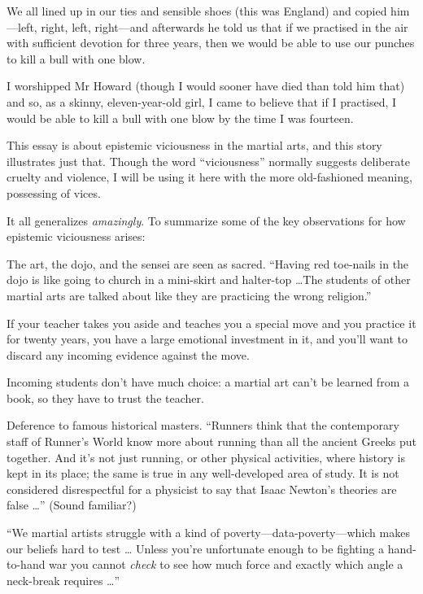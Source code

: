 {
 We all lined up in our ties and sensible shoes (this was England)
and copied him---left, right, left, right---and afterwards he told us
that if we practised in the air with sufficient devotion for three
years, then we would be able to use our punches to kill a bull with one
blow.}

{
 I worshipped Mr Howard (though I would sooner have died than told
him that) and so, as a skinny, eleven-year-old girl, I came to believe
that if I practised, I would be able to kill a bull with one blow by
the time I was fourteen.}

{
 This essay is about epistemic viciousness in the martial arts, and
this story illustrates just that. Though the word
``viciousness'' normally suggests
deliberate cruelty and violence, I will be using it here with the more
old-fashioned meaning, possessing of vices.}

{
 It all generalizes \textit{amazingly}. To summarize some of the
key observations for how epistemic viciousness arises:}

{
 The art, the dojo, and the sensei are seen as sacred.
``Having red toe-nails in the dojo is like going to
church in a mini-skirt and halter-top \ldots The students of other
martial arts are talked about like they are practicing the wrong
religion.''}

{
 If your teacher takes you aside and teaches you a special move and
you practice it for twenty years, you have a large emotional investment
in it, and you'll want to discard any incoming evidence
against the move.}

{
 Incoming students don't have much choice: a
martial art can't be learned from a book, so they have
to trust the teacher.}

{
 Deference to famous historical masters. ``Runners
think that the contemporary staff of Runner's World
know more about running than all the ancient Greeks put together. And
it's not just running, or other physical activities,
where history is kept in its place; the same is true in any
well-developed area of study. It is not considered disrespectful for a
physicist to say that Isaac Newton's theories are false
\ldots'' (Sound familiar?)}

{
 ``We martial artists struggle with a kind of
poverty---data-poverty---which makes our beliefs hard to test \ldots
Unless you're unfortunate enough to be fighting a
hand-to-hand war you cannot \textit{check} to see how much force and
exactly which angle a neck-break requires \ldots''}

